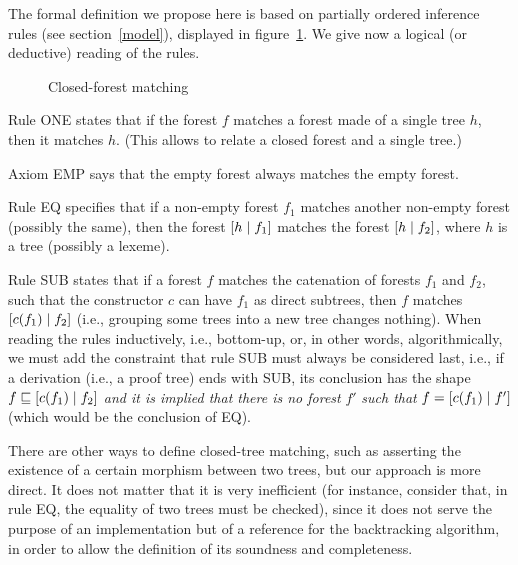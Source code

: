 The formal definition we propose here is based on partially ordered
inference rules (see section~\ref{model}), displayed in
figure~\ref{x_tree_matching_def}. We give now a logical (or deductive)
reading of the rules.

\begin{figure}[H]
\caption{Closed\hyp{}forest matching\label{x_tree_matching_def}}
\end{figure}

Rule \textsf{ONE} states that if the forest \(f\) matches a forest
made of a single tree \(h\), then it matches \(h\). (This allows to
relate a closed forest and a single tree.)

Axiom \textsf{EMP} says that the empty forest always matches the empty
forest.

Rule \textsf{EQ} specifies that if a non\hyp{}empty forest \(f_1\)
matches another non\hyp{}empty forest (possibly the same), then the
forest \([{h}\mid{f_1}]\) matches the forest \([{h}\mid{f_2}]\), where
\(h\) is a tree (possibly a lexeme). 

Rule \textsf{SUB} states that if a forest \(f\) matches the catenation
of forests \(f_1\) and \(f_2\), such that the constructor \(c\) can
have \(f_1\) as direct subtrees, then \(f\) matches
\([{c(f_1)}\mid{f_2}]\) (i.e., grouping some trees into a new tree
changes nothing). When reading the rules inductively, i.e.,
bottom\hyp{}up, or, in other words, algorithmically, we must add the
constraint that rule \textsf{SUB} must always be considered last,
i.e., if a derivation (i.e., a proof tree) ends with \textsf{SUB}, its
conclusion has the shape \(f \sqsubseteq [{c(f_1)}\mid{f_2}]\)
\emph{and it is implied that there is no forest} \(f'\) \emph{such
that} \(f = [{c(f_1)}\mid{f'}]\) (which would be the conclusion of
\textsf{EQ}).
\begin{remark}
There are other ways to define closed\hyp{}tree matching, such as
asserting the existence of a certain morphism between two trees, but
our approach is more direct. It does not matter that it is very
inefficient (for instance, consider that, in rule \textsf{EQ}, the
equality of two trees must be checked), since it does not serve the
purpose of an implementation but of a reference for the backtracking
algorithm, in order to allow the definition of its soundness and
completeness.
\end{remark}

